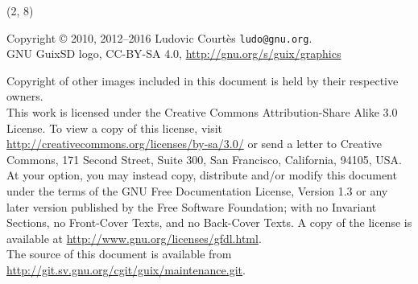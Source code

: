 \documentclass[aspectratio=169]{beamer}
\begin{document}
\begin{frame}{}

  \begin{textblock}{12}(2, 8)
    \tiny{
      Copyright \copyright{} 2010, 2012--2016 Ludovic Courtès \texttt{ludo@gnu.org}.\\[3.0mm]
      GNU GuixSD logo, CC-BY-SA 4.0, \url{http://gnu.org/s/guix/graphics}

      Copyright of other images included in this document is held by
      their respective owners.
      \\[3.0mm]
      This work is licensed under the \alert{Creative Commons
        Attribution-Share Alike 3.0} License.  To view a copy of this
      license, visit
      \url{http://creativecommons.org/licenses/by-sa/3.0/} or send a
      letter to Creative Commons, 171 Second Street, Suite 300, San
      Francisco, California, 94105, USA.
      \\[2.0mm]
      At your option, you may instead copy, distribute and/or modify
      this document under the terms of the \alert{GNU Free Documentation
        License, Version 1.3 or any later version} published by the Free
      Software Foundation; with no Invariant Sections, no Front-Cover
      Texts, and no Back-Cover Texts.  A copy of the license is
      available at \url{http://www.gnu.org/licenses/gfdl.html}.
      \\[2.0mm]
      The source of this document is available from
      \url{http://git.sv.gnu.org/cgit/guix/maintenance.git}.
    }
  \end{textblock}
\end{frame}
\end{document}
